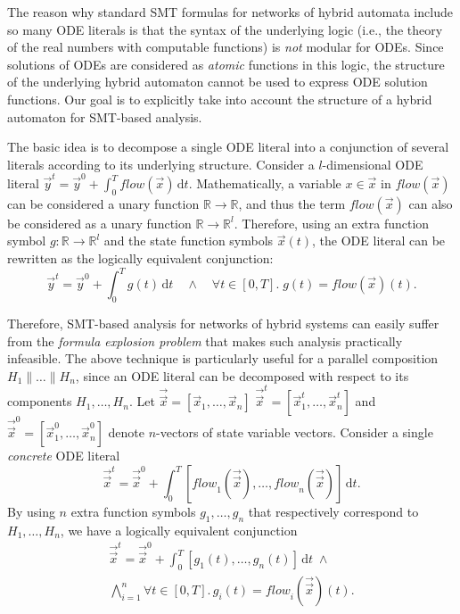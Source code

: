 The reason why standard SMT formulas for networks of hybrid automata include so many ODE literals 
is that the syntax of the underlying logic 
(i.e., the theory of the real numbers with computable functions)
is \emph{not} modular  for ODEs. %
Since solutions of ODEs %
are considered as \emph{atomic} functions in this logic,
the structure of the underlying hybrid automaton 
cannot be used to express ODE solution functions.
Our goal is to explicitly take into account the structure of a hybrid automaton
for SMT-based analysis.



The basic idea is to decompose a single ODE literal
into a conjunction of several literals according to its underlying structure.
%
Consider a $l$-dimensional ODE literal
$\vec{y}^t = \vec{y}^0 + \textstyle\int_{0}^T \mathit{flow}(\vec{x}) \,\mathrm{d}t$.
Mathematically,
a variable $x \in \vec{x}$ in $\mathit{flow}(\vec{x})$ 
can be considered a unary function $\mathbb{R} \to \mathbb{R}$,
%
and thus
the term $\mathit{flow}(\vec{x})$ can also be considered as a unary function
$\mathbb{R} \to \mathbb{R}^l$.
%
Therefore, 
using an extra function symbol $g : \mathbb{R} \to \mathbb{R}^l$
and the state function symbols $\vec{x}(t)$,
the ODE literal can be rewritten as the logically equivalent conjunction: 
\[
\vec{y}^t = \vec{y}^0 + \textstyle\int_{0}^T g(t)  \,\mathrm{d}t
\quad\wedge\quad
\forall t \in [0,T].\; g(t) = \mathit{flow}(\vec{x})(t).
\]
%


%
Therefore, SMT-based analysis for networks of hybrid systems
can easily suffer from the \emph{formula explosion problem}
that makes such %
 analysis practically infeasible.
%
The above technique 
is particularly useful for a parallel composition $H_1 \parallel \ldots \parallel H_n$,
since an ODE literal can be decomposed with respect to its components $H_1, \ldots, H_n$.
Let $\overrightarrow{\vec{x}} = [\vec{x}_{1},\ldots,\vec{x}_{n}]$ 
$\overrightarrow{\vec{x}}^t = [\vec{x}_{1}^t,\ldots,\vec{x}_{n}^t]$
and $\overrightarrow{\vec{x}}^0 = [\vec{x}_{1}^0,\ldots,\vec{x}_{n}^0]$
denote $n$-vectors of state variable vectors.
Consider a single \emph{concrete} ODE literal
\[
\overrightarrow{\vec{x}}^t
=
\overrightarrow{\vec{x}}^0
+
\int_0^T
[\mathit{flow}_1(\overrightarrow{\vec{x}}),\ldots,\mathit{flow}_n(\overrightarrow{\vec{x}})]\,\mathrm{d}t.
\]
By using $n$ extra function symbols $g_1, \ldots, g_n$ that 
respectively correspond to $H_1, \ldots, H_n$,
we have a logically equivalent conjunction 
\begin{align*}
\overrightarrow{\vec{x}}^t
=
\overrightarrow{\vec{x}}^0
+
\int_0^T
[g_1(t),\ldots,g_n(t)]
\,\mathrm{d}t
\;\wedge\;
\\
\bigwedge_{i = 1}^n
\forall t \in [0,T].\,
g_i(t) = \mathit{flow}_i(\overrightarrow{\vec{x}})(t).
\end{align*}



